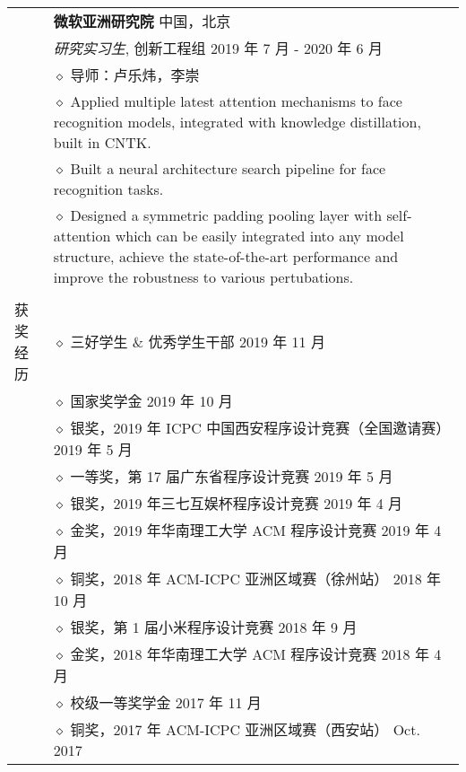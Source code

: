 \documentclass[letterpaper, 11pt]{article}
\begin{document}
\begin{longtable}{p{1.3in}p{4.8in}}
& {\textbf{微软亚洲研究院}} \hfill 中国，北京 \\
& \textit{研究实习生}, 创新工程组 \hfill 2019 年 7 月 - 2020 年 6 月 \\
& $\diamond$ 导师：卢乐炜，李崇 \\
& $\diamond$ Applied multiple latest attention mechanisms to face recognition models, integrated with knowledge distillation, built in CNTK. \\
& $\diamond$ Built a neural architecture search pipeline for face recognition tasks. \\
& $\diamond$ Designed a symmetric padding pooling layer with self-attention which can be easily integrated into any model structure, achieve the state-of-the-art performance and improve the robustness to various pertubations. \\
& \\

{获奖经历}
& $\diamond$ 三好学生 \& 优秀学生干部 \hfill 2019 年 11 月 \\

& $\diamond$ 国家奖学金 \hfill 2019 年 10 月 \\

& $\diamond$ 银奖，2019 年 ICPC 中国西安程序设计竞赛（全国邀请赛） \hfill 2019 年 5 月 \\

& $\diamond$ 一等奖，第 17 届广东省程序设计竞赛 \hfill 2019 年 5 月 \\

& $\diamond$ 银奖，2019 年三七互娱杯程序设计竞赛 \hfill 2019 年 4 月 \\

& $\diamond$ 金奖，2019 年华南理工大学 ACM 程序设计竞赛 \hfill 2019 年 4 月 \\

& $\diamond$ 铜奖，2018 年 ACM-ICPC 亚洲区域赛（徐州站） \hfill 2018 年 10 月 \\

& $\diamond$ 银奖，第 1 届小米程序设计竞赛 \hfill 2018 年 9 月 \\

& $\diamond$ 金奖，2018 年华南理工大学 ACM 程序设计竞赛 \hfill 2018 年 4 月 \\

& $\diamond$ 校级一等奖学金 \hfill 2017 年 11 月 \\

& $\diamond$ 铜奖，2017 年 ACM-ICPC 亚洲区域赛（西安站） \hfill Oct. 2017 \\


\end{longtable}
\end{document}
